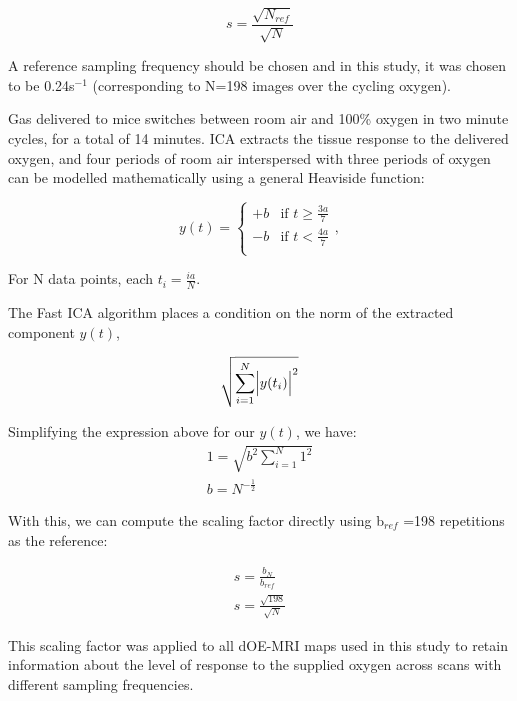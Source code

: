 \begin{equation}
s = \frac{\sqrt{N_{ref}}}{\sqrt{N}}
\label{correctionfactor}
\end{equation}

A reference sampling frequency should be chosen and in this study, it was chosen to be 0.24s$^{-1}$ (corresponding to N=198 images over the cycling oxygen).

Gas delivered to mice switches between room air and 100\% oxygen in two minute cycles, for a total of 14 minutes.
 \ac{ICA} extracts the tissue response to the delivered oxygen, and four periods of room air interspersed with three periods of oxygen can be modelled mathematically using a general Heaviside function:

\begin{equation}
y(t) =
  \begin{cases}
                                   +b & \text{if $t\geq \frac{3a}{7}$} \\
                                   -b & \text{if $t< \frac{4a}{7}$} \\
  \end{cases},
\end{equation}

For N data points, each $t_i = \frac{ia}{N}$.

The Fast \ac{ICA} algorithm places a condition on the norm of the extracted component $y(t)$,

\begin{equation}
\sqrt{\sum_{i=1}^{N} \Bigl|y(t_i)\Bigr|^2} %
\end{equation}

Simplifying the expression above for our $y(t)$, we have:
\begin{align}
1 = \sqrt{b^2 \sum_{i=1}^{N} 1^2} \nonumber \\
b = N^{-\frac{1}{2}}
\end{align}

With this, we can compute the scaling factor directly using b$_{ref}$ =198 repetitions as the reference:

\begin{align}
s = \frac{b_{N}}{b_{ref}} \nonumber \\
s = \frac{\sqrt{198}}{\sqrt{N}} 
\end{align}

This scaling factor was applied to all \ac{dOE-MRI} maps used in this study to retain information about the level of response to the supplied oxygen across scans with different sampling frequencies.


